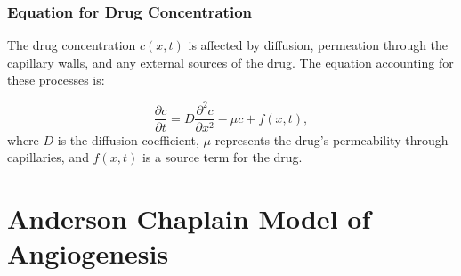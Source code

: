 \subsubsection{Equation for Drug Concentration}
The drug concentration \(c(x,t)\) is affected by diffusion, permeation through the capillary walls, and any external sources of the drug. The equation accounting for these processes is:

\begin{equation}
	\frac{\partial c}{\partial t} = D\frac{\partial^2 c}{\partial x^2} - \mu c + f(x,t),
\end{equation}
where \(D\) is the diffusion coefficient, \(\mu\) represents the drug's permeability through capillaries, and \(f(x,t)\) is a source term for the drug.

\newpage

\section{Anderson Chaplain Model of Angiogenesis}

